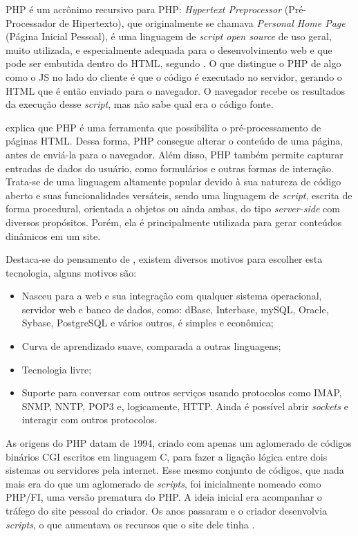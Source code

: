 PHP é um acrônimo recursivo para PHP: \textit{Hypertext Preprocessor} (Pré-Processador de Hipertexto), que originalmente se chamava \textit{Personal Home Page} (Página Inicial Pessoal), é uma linguagem de \textit{script open source} de uso geral, muito utilizada, e especialmente adequada para o desenvolvimento web e que pode ser embutida dentro do HTML, segundo . O que distingue o PHP de algo como o JS no lado do cliente é que o código é executado no servidor, gerando o HTML que é então enviado para o navegador. O navegador recebe os resultados da execução desse \textit{script}, mas não sabe qual era o código fonte.

 explica que PHP é uma ferramenta que possibilita o pré-processamento de páginas HTML. Dessa forma, PHP consegue alterar o conteúdo de uma página, antes de enviá-la para o navegador. Além disso, PHP também permite capturar entradas de dados do usuário, como formulários e outras formas de interação. Trata-se de uma linguagem altamente popular devido à sua natureza de código aberto e suas funcionalidades versáteis, sendo uma linguagem de \textit{script}, escrita de forma procedural, orientada a objetos ou ainda ambas, do tipo \textit{server-side} com diversos propósitos. Porém, ela é principalmente utilizada para gerar conteúdos dinâmicos em um site.

Destaca-se do pensamento de , existem diversos motivos para escolher esta tecnologia, alguns motivos são:

\begin{itemize}
    \item Nasceu para a web e sua integração com qualquer sistema operacional, servidor web e banco de dados, como: dBase, Interbase, mySQL, Oracle, Sybase, PostgreSQL e vários outros, é simples e econômica;
    \item Curva de aprendizado suave, comparada a outras linguagens;
    \item Tecnologia livre;
    \item Suporte para conversar com outros serviços usando protocolos como IMAP, SNMP, NNTP, POP3 e, logicamente, HTTP. Ainda é possível abrir \textit{sockets} e interagir com outros protocolos.
\end{itemize}

As origens do PHP datam de 1994, criado com apenas um aglomerado de códigos binários CGI escritos em linguagem C, para fazer a ligação lógica entre dois sistemas ou servidores pela internet. Esse mesmo conjunto de códigos, que nada mais era do que um aglomerado de \textit{scripts}, foi inicialmente nomeado como PHP/FI, uma versão prematura do PHP. A ideia inicial era acompanhar o tráfego do site pessoal do criador. Os anos passaram e o criador desenvolvia \textit{scripts}, o que aumentava os recursos que o site dele tinha \cite{phpdevelopment}.

